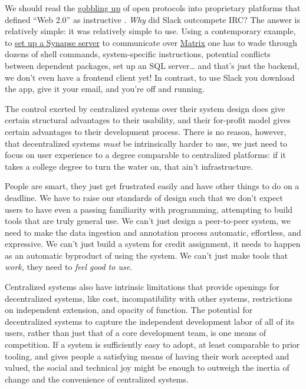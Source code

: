 We should read the
\href{https://en.wikipedia.org/wiki/Embrace,_extend,_and_extinguish}{gobbling
up} of open protocols into proprietary platforms that defined ``Web
2.0'' as instructive\citep{markoffTomorrowWorldWide1996} . \emph{Why} did Slack outcompete
IRC? The answer is
relatively simple: it was relatively simple to use. Using a contemporary
example, to
\href{https://matrix-org.github.io/synapse/latest/setup/installation.html}{set
up a Synapse server} to communicate over
\href{https://matrix.org/docs/spec/}{Matrix} one has to wade through
dozens of shell commands, system-specific instructions, potential
conflicts between dependent packages, set up an SQL server\ldots{} and
that's just the backend, we don't even have a frontend client yet! In
contrast, to use Slack you download the app, give it your email, and
you're off and running.

The control exerted by centralized systems over their system design does
give certain structural advantages to their usability, and their
for-profit model gives certain advantages to their development process.
There is no reason, however, that decentralized systems \emph{must} be
intrinsically harder to use, we just need to focus on user experience to
a degree comparable to centralized platforms: if it takes a college
degree to turn the water on, that ain't infrastructure.

People are smart, they just get frustrated easily and have other things
to do on a deadline. We have to raise our standards of design such that
we don't expect users to have even a passing familiarity with
programming, attempting to build tools that are truly general use. We
can't just design a peer-to-peer system, we need to make the data
ingestion and annotation process automatic, effortless, and expressive.
We can't just build a system for credit assignment, it needs to happen
as an automatic byproduct of using the system. We can't just make tools
that \emph{work,} they need to \emph{feel good to use.}

Centralized systems also have intrinsic limitations that provide
openings for decentralized systems, like cost, incompatibility with
other systems, restrictions on independent extension, and opacity of
function. The potential for decentralized systems to capture the
independent development labor of all of its users, rather than just that
of a core development team, is one means of competition. If a system is
sufficiently easy to adopt, at least comparable to prior tooling, and
gives people a satisfying means of having their work accepted and
valued, the social and technical joy might be enough to outweigh the
inertia of change and the convenience of centralized systems.

